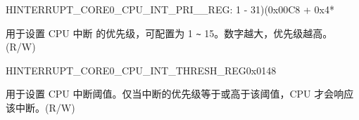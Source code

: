 \begin{register}{H}{INTERRUPT\_CORE0\_CPU\_INT\_PRI\_\_REG}{: 1 - 31)(0x00C8 + 0x4*}\label{regdesc:INTERRUPTCORE0CPUINTPRI0REG}
%
%
\regnewline%
\begin{regdesc}\begin{reglist}
\label{fielddesc:INTERRUPTCORE0CPUPRI0MAP}\item [INTERRUPT\_CORE0\_CPU\_PRI\_\regindex{n}\_MAP] 用于设置 CPU 中断  的优先级，可配置为 1 \verb+~+ 15。数字越大，优先级越高。(R/W)
\end{reglist}\end{regdesc}
\end{register}

\begin{register}{H}{INTERRUPT\_CORE0\_CPU\_INT\_THRESH\_REG}{0x0148}\label{regdesc:INTERRUPTCORE0CPUINTTHRESHREG}
%
%
\regnewline%
\begin{regdesc}\begin{reglist}
\label{fielddesc:INTERRUPTCORE0CPUINTTHRESH}\item [INTERRUPT\_CORE0\_CPU\_INT\_THRESH] 用于设置 CPU 中断阈值。仅当中断的优先级等于或高于该阈值，CPU 才会响应该中断。(R/W)

\end{reglist}\end{regdesc}
\end{register}
